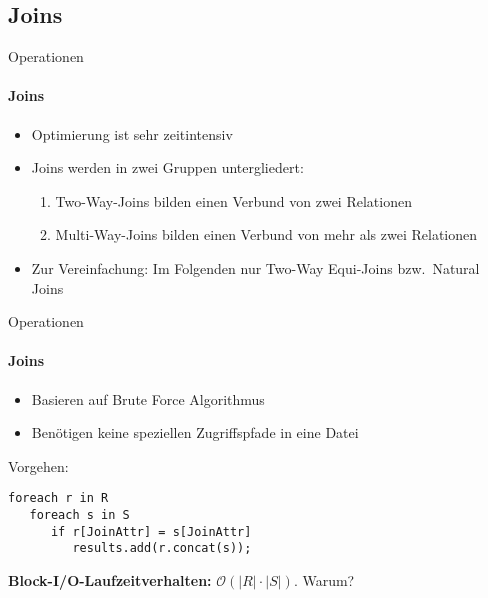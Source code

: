 \subsection{Joins}

\begin{frame}[fragile]{Operationen}
\framesubtitle{Joins}
\begin{itemize}
\item Optimierung ist sehr zeitintensiv
\item Joins werden in zwei Gruppen untergliedert: 
\begin{enumerate}
	\item Two-Way-Joins bilden einen Verbund von zwei Relationen
	\item Multi-Way-Joins bilden einen Verbund von mehr als zwei Relationen
\end{enumerate}
\pause
\item Zur Vereinfachung: Im Folgenden nur Two-Way Equi-Joins bzw.~Natural Joins 
\end{itemize}
\end{frame}


\begin{frame}[fragile]{Operationen}
\framesubtitle{Joins}
\begin{itemize}
	\item Basieren auf Brute Force Algorithmus 
	\item Benötigen keine speziellen Zugriffspfade in eine Datei
\end{itemize}
\pause
\abs
Vorgehen: 
\begin{lstlisting}
foreach r in R 
   foreach s in S 
      if r[JoinAttr] = s[JoinAttr]
         results.add(r.concat(s)); 
\end{lstlisting}
\pause
\textbf{Block-I/O-Laufzeitverhalten:} $\mathcal{O}(|R|\cdot |S|)$. Warum?
\end{frame}

